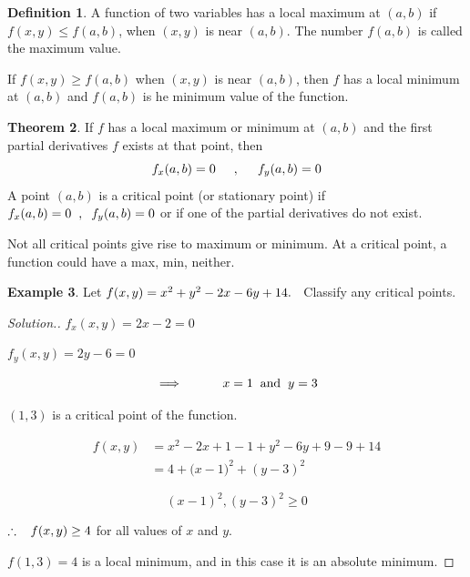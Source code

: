 \documentclass[11pt,a4paper]{article}
\theoremstyle{definition}
\newtheorem{thm}{Theorem}[subsection]
\newtheorem{defn}[thm]{Definition}
\newtheorem{exa}[thm]{Example}
\newenvironment{solution}
  {\renewcommand{\qedsymbol}{}\begin{proof}[\textit{Solution}.]}
  {\end{proof}}
\begin{document}
\begin{defn}


A function of two variables has a local maximum at $(a,b)$ if $\displaystyle{f(x,y)\leq f(a,b)}$, when $(x,y)$ is near $(a,b)$. The number $f(a,b)$ is called the maximum value.


If $f(x,y)\geq f(a,b)$ when $(x,y)$ is near $(a,b)$, then $f$ has a local minimum at $(a,b)$ and $f(a,b)$ is he minimum value of the function.
\end{defn}


\begin{thm}


If $f$ has a local maximum or minimum at $(a,b)$ and the first partial derivatives $f$ exists at that point, then $$f_x(a,b) = 0\hspace{0.5cm},\hspace{0.5cm} f_y(a,b) = 0$$
A point $(a,b)$ is a critical point (or stationary point) if $f_x(a,b)=0\hspace{0.2cm},\hspace{0.2cm}f_y(a,b) =0$ or if one of the partial derivatives do not exist.


Not all critical points give rise to maximum or minimum. At a critical point, a function could have a max, min, neither.
\end{thm}


\begin{exa}


Let $f(x,y) = x^2 + y^2 - 2x -6y + 14.\hspace{0.2cm}$ Classify any critical points.
\end{exa}


\begin{solution}


$f_x(x,y)  = 2x -2 = 0$


$f_y(x,y)  = 2y - 6 =0$

$$ \implies \hspace{1cm} x =1 \hspace{0.2cm} \text{and}\hspace{0.2cm} y =3$$

$(1,3)$ is a critical point of the function.

\begin{align*}
f(x,y) & = x^2 -2x + 1-1+y^2 -6y +9 -9 + 14\\
& = 4 +\big(x-1)^2 + (y-3)^2
\end{align*}

$$(x - 1)^2 , (y-3)^2\geq 0$$

$\therefore\hspace{0.3cm}f(x,y)\geq 4$ for all values of $x$ and $y$.


$f(1,3) =4$ is a local minimum,
and in this case it is an absolute minimum.
\end{solution}
\end{document}
